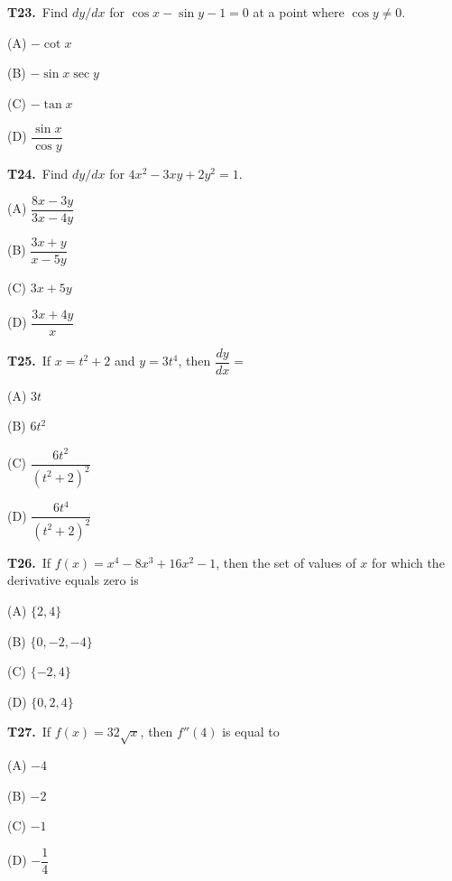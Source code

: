 \documentclass[11pt]{article}
\begin{document}
\bigskip\noindent\textbf{T23.}\ Find $dy/dx$ for $\cos x-\sin y-1=0$ at a point where $\cos y\ne0$.
\begin{list}{}{\setlength{\leftmargin}{3em}\setlength{\labelwidth}{2.5em}\setlength{\itemsep}{0pt}\setlength{\topsep}{2pt}}
\item[(A)] $-\cot x$
\item[(B)] $-\sin x \sec y$
\item[(C)] $-\tan x$
\item[(D)] $\dfrac{\sin x}{\cos y}$
\end{list}

\bigskip\noindent\textbf{T24.}\ Find $dy/dx$ for $4x^2 - 3xy + 2y^2 = 1$.
\begin{list}{}{\setlength{\leftmargin}{3em}\setlength{\labelwidth}{2.5em}\setlength{\itemsep}{0pt}\setlength{\topsep}{2pt}}
\item[(A)] $\dfrac{8x-3y}{3x-4y}$
\item[(B)] $\dfrac{3x+y}{x-5y}$
\item[(C)] $3x+5y$
\item[(D)] $\dfrac{3x+4y}{x}$
\end{list}

\bigskip\noindent\textbf{T25.}\ If $x = t^2+2$ and $y = 3t^4$, then $\dfrac{dy}{dx} =$
\begin{list}{}{\setlength{\leftmargin}{3em}\setlength{\labelwidth}{2.5em}\setlength{\itemsep}{0pt}\setlength{\topsep}{2pt}}
\item[(A)] $3t$
\item[(B)] $6t^2$
\item[(C)] $\dfrac{6t^2}{(t^2+2)^2}$
\item[(D)] $\dfrac{6t^4}{(t^2+2)^2}$
\end{list}

\bigskip\noindent\textbf{T26.}\ If $f(x) = x^4 - 8x^3 + 16x^2 - 1$, then the set of values of $x$ for which the derivative equals zero is
\begin{list}{}{\setlength{\leftmargin}{3em}\setlength{\labelwidth}{2.5em}\setlength{\itemsep}{0pt}\setlength{\topsep}{2pt}}
\item[(A)] $\{2,4\}$
\item[(B)] $\{0,-2,-4\}$
\item[(C)] $\{-2,4\}$
\item[(D)] $\{0,2,4\}$
\end{list}

\bigskip\noindent\textbf{T27.}\ If $f(x) = 32\sqrt{x}$, then $f''(4)$ is equal to
\begin{list}{}{\setlength{\leftmargin}{3em}\setlength{\labelwidth}{2.5em}\setlength{\itemsep}{0pt}\setlength{\topsep}{2pt}}
\item[(A)] $-4$
\item[(B)] $-2$
\item[(C)] $-1$
\item[(D)] $-\dfrac{1}{4}$
\end{list}
\end{document}
